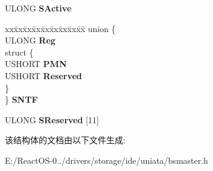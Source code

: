 \begin{DoxyCompactItemize}
\begin{tabbing}
\end{tabbing}\item 
\mbox{\label{struct___i_d_e___s_a_t_a___r_e_g_i_s_t_e_r_s_a6b8dcfa6e46677369a9b6aca2a5431eb}} 
U\+L\+O\+NG {\bfseries S\+Active}
\item 
\mbox{\label{struct___i_d_e___s_a_t_a___r_e_g_i_s_t_e_r_s_a0d945a66f4e9e7e5b956409ca70cad63}} 
\begin{tabbing}
xx\=xx\=xx\=xx\=xx\=xx\=xx\=xx\=xx\=\kill
union \{\\
\>ULONG {\bfseries Reg}\\
\mbox{\label{union___i_d_e___s_a_t_a___r_e_g_i_s_t_e_r_s_1_1_0D1006_aceee207860a7f340db1b19e5d6e535fb}} 
\>struct \{\\
\>\>USHORT {\bfseries PMN}\\
\>\>USHORT {\bfseries Reserved}\\
\>\} \\
\} {\bfseries SNTF}\\

\end{tabbing}\item 
\mbox{\label{struct___i_d_e___s_a_t_a___r_e_g_i_s_t_e_r_s_a8d074a1eb83cd636b3cb4538d759bdff}} 
U\+L\+O\+NG {\bfseries S\+Reserved} \mbox{[}11\mbox{]}
\end{DoxyCompactItemize}


该结构体的文档由以下文件生成\+:\begin{DoxyCompactItemize}
\item 
E\+:/\+React\+O\+S-\/0../drivers/storage/ide/uniata/bsmaster.\+h\end{DoxyCompactItemize}
